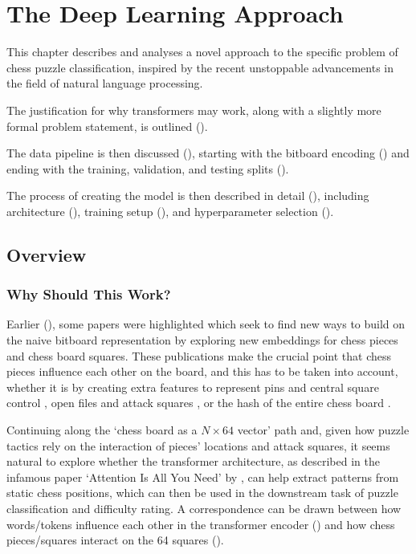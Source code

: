 \chapter{The Deep Learning Approach}\label{mlChapter}

This chapter describes and analyses a novel approach to the specific problem of
chess puzzle classification, inspired by the recent unstoppable advancements in
the field of natural language processing.

The justification for why transformers may work, along with a slightly more
formal problem statement, is outlined ().

The data pipeline is then discussed (), starting with the bitboard
encoding () and ending with the training, validation, and testing
splits ().

The process of creating the model is then described in detail (),
including architecture (), training setup (), and
hyperparameter selection ().


\section{Overview}\label{mlS0}

\subsection{Why Should This Work?}

Earlier (), some papers were highlighted which seek to find new ways
to build on the naive bitboard representation by exploring new embeddings for
chess pieces and chess board squares. These publications make the crucial point
that chess pieces influence each other on the board, and this has to be taken
into account, whether it is by creating extra features to represent pins and
central square control \citep{chessCNN}, open files and attack squares
\citep{middleGamePatterns}, or the hash of the entire chess board
\cite{chess2vec}.

Continuing along the `chess board as a $N\times64$ vector' path and, given how
puzzle tactics rely on the interaction of pieces' locations and attack squares,
it seems natural to explore whether the transformer architecture, as described
in the infamous paper `Attention Is All You Need' by \citet{attention}, can
help extract patterns from static chess positions, which can then be used in
the downstream task of puzzle classification and difficulty rating. A
correspondence can be drawn between how words/tokens influence each other in
the transformer encoder () and how chess pieces/squares
interact on the 64 squares ().

